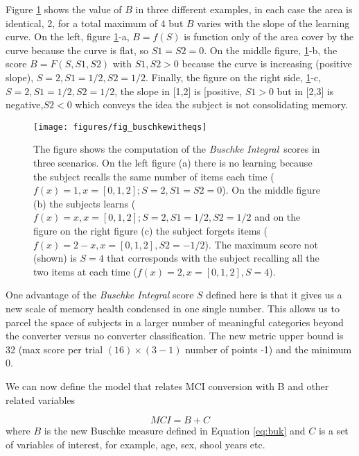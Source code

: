 \documentclass[11pt]{article}
\begin{document}
Figure \ref{fig:b} shows the value of $B$ in three different examples, in each case the area is identical, 2, for a total maximum of 4 but $B$ varies with the slope of the learning curve. On the left, figure \ref{fig:b}-a,
$B=f(S)$ is function only of the area cover by the curve because the curve is flat, so $S1=S2=0$. 
On the middle figure, \ref{fig:b}-b, the score $B=F(S,S1,S2)$ with $S1,S2>0$ because the curve is increasing (positive slope), $S=2, S1=1/2, S2=1/2$. Finally, the figure on the right side, \ref{fig:b}-c, $S=2, S1=1/2, S2=1/2$, the slope in [1,2] is [positive, $S1>0$ but in [2,3] is negative,$S2<0$ which conveys the idea the subject is not consolidating memory.      
  
\begin{figure}[H]
        \centering
        \texttt{[image: figures/fig\_buschkewitheqs]}
        \caption{The figure shows the computation of the \emph{Buschke Integral} scores in three scenarios. On the left figure (a) there is no learning because the subject recalls the same number of items each time ($f(x)=1, x=[0,1,2]; S=2, S1=S2=0$). On the middle figure (b) the subjects learns ($f(x)=x, x=[0,1,2]; S=2, S1=1/2, S2=1/2$ and on the figure on the right figure (c) the subject forgets items ($f(x)=2-x, x=[0,1,2], S2=-1/2$). The maximum score not (shown) is $S=4$ that corresponds with the subject recalling all the two items at each time ($f(x)=2, x=[0,1,2], S=4$).} 
        \label{fig:b}
\end{figure}

One advantage of the \emph{Buschke Integral} score $S$ defined here is that it gives us a new scale of memory health condensed in one single number. This allows us to parcel the space of subjects in a larger number of meaningful categories beyond the converter versus no converter classification. The new metric upper bound is 32 (max score per trial $(16)\times (3-1)$ number of points -1) and the minimum 0.

We can now define the model that relates MCI conversion with B and other related variables

\begin{equation}
MCI = B + C
\label{eq:mci_b_o}
\end{equation}
where $B$ is the new Buschke measure defined in Equation \ref{eq:buk} and $C$ is a set of variables of interest, for example, age, sex, shool years etc.
\end{document}
